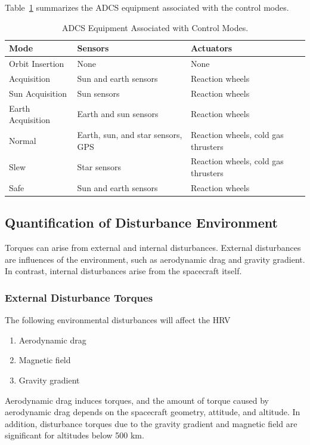 \documentclass[paper=letter, fontsize=11pt]{scrartcl} %
\numberwithin{equation}{section} %
\numberwithin{figure}{section} %
\numberwithin{table}{section} %
\begin{document}
\bigskip Table~\ref{table:scctrl} summarizes the ADCS equipment associated with the control modes.

\begin{table}[H]
\centering
\begin{tabular}{l l l}
\toprule
Mode & Sensors & Actuators \\
\midrule
Orbit Insertion & None & None \\
Acquisition  & Sun and earth sensors & Reaction wheels \\
Sun Acquisition & Sun sensors & Reaction wheels\\
Earth Acquisition & Earth and sun sensors & Reaction wheels \\
Normal & Earth, sun, and star sensors, GPS & Reaction wheels, cold gas thrusters \\
Slew & Star sensors & Reaction wheels, cold gas thrusters  \\
Safe & Sun and earth sensors & Reaction wheels \\
\bottomrule
\end{tabular}
\caption{ADCS Equipment Associated with Control Modes.}
\label{table:scctrl}
\end{table}

\subsection{Quantification of Disturbance Environment}
\par Torques can arise from external and internal disturbances. External disturbances are influences of the environment, such as aerodynamic drag and gravity gradient. In contrast, internal disturbances arise from the spacecraft itself.

\subsubsection {External Disturbance Torques}
\par The following environmental disturbances will affect the HRV
\begin{enumerate}
\item Aerodynamic drag
\item Magnetic field
\item Gravity gradient
\end{enumerate}

\bigskip \par Aerodynamic drag induces torques, and the amount of torque caused by aerodynamic drag depends on the spacecraft geometry, attitude, and altitude. In addition, disturbance torques due to the gravity gradient and magnetic field are significant for altitudes below 500 km.
\end{document}

